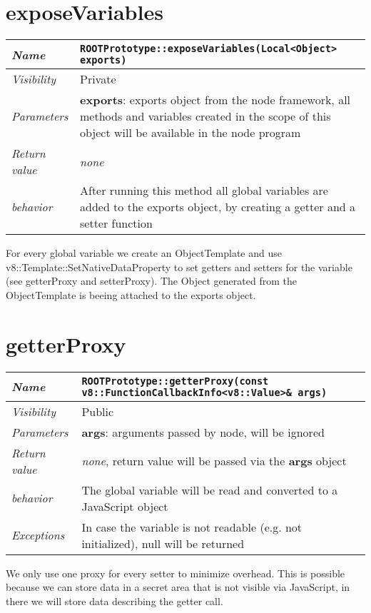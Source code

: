 \section{exposeVariables}
\begin{longtable}{p{3cm} @{\hskip 1cm} p{12cm}}
  \hline
  \textit{Name} & \texttt{ROOTPrototype::exposeVariables(Local<Object> exports)} \\
  \hline
  \textit{Visibility} & Private \\
  \hline
  \textit{Parameters} & \textbf{exports}: exports object from the node framework, all methods and variables created in the scope of this object will be available in the node program \\
  \hline
  \textit{Return value} & \textit{none} \\
  \hline
  \textit{behavior} & After running this method all global variables are added to the exports object, by creating a getter and a setter function \\
  \hline
\end{longtable}

For every global variable we create an ObjectTemplate and use v8::Template::SetNativeDataProperty to set getters and setters for the variable (see getterProxy and setterProxy).
The Object generated from the ObjectTemplate is beeing attached to the exports object.

\newpage
\section{getterProxy}
\begin{longtable}{p{3cm} @{\hskip 1cm} p{12cm}}
  \hline
  \textit{Name} & \texttt{ROOTPrototype::getterProxy(const v8::FunctionCallbackInfo<v8::Value>\& args)} \\
  \hline
  \textit{Visibility} & Public \\
  \hline
  \textit{Parameters} & \textbf{args}: arguments passed by node, will be ignored \\
  \hline
  \textit{Return value} & \textit{none}, return value will be passed via the \textbf{args} object \\
  \hline
  \textit{behavior} & The global variable will be read and converted to a JavaScript object\\
  \hline
  \textit{Exceptions} & In case the variable is not readable (e.g. not initialized), null will be returned
  \hline
\end{longtable}
We only use one proxy for every setter to minimize overhead. This is possible because we can store data in a secret area that is not visible via JavaScript, in there we will store data describing the getter call.
\newpage
